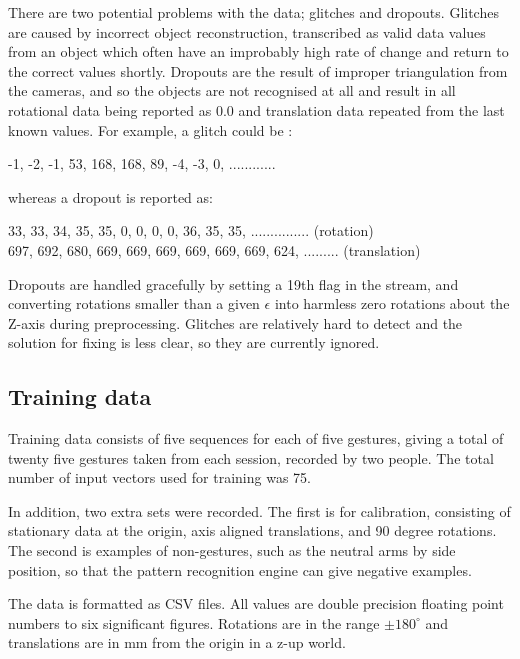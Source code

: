 \documentclass[12pt,a4,notitlepage]{report}
\renewcommand{\_}{\texttt{\symbol{95}}}
\newcommand{\<}{\texttt{\symbol{60}}}
\renewcommand{\>}{\texttt{\symbol{62}}}
\begin{document}
There are two potential problems with the data; glitches and dropouts. Glitches are caused by incorrect object reconstruction, transcribed as valid data values from an object which often have an improbably high rate of change and return to the correct values shortly. Dropouts are the result of improper triangulation from the cameras, and so the objects are not recognised at all and result in all rotational data being reported as 0.0 and translation data repeated from the last known values. For example, a glitch could be :

-1, -2, -1, 53, 168, 168, 89, -4, -3, 0, ............

whereas a dropout is reported as:

33, 33, 34, 35, 35, 0, 0, 0, 0, 36, 35, 35, ............... (rotation) \\
697, 692, 680, 669, 669, 669, 669, 669, 669, 624, ......... (translation)

Dropouts are handled gracefully by setting a 19th flag in the stream, and converting rotations smaller than a given $\epsilon$ into harmless zero rotations about the Z-axis during preprocessing. Glitches are relatively hard to detect and the solution for fixing is less clear, so they are currently ignored.

\subsection{Training data}

Training data consists of five sequences for each of five gestures, giving a total of twenty five gestures taken from each session, recorded by two people. The total number of input vectors used for training was 75.

In addition, two extra sets were recorded. The first is for calibration, consisting of stationary data at the origin, axis aligned translations, and 90 degree rotations. The second is examples of non-gestures, such as the neutral arms by side position, so that the pattern recognition engine can give negative examples.

The data is formatted as CSV files. All values are double precision floating point numbers to six significant figures. Rotations are in the range $ \pm 180^{\circ}$ and translations are in mm from the origin in a z-up world.
\end{document}

